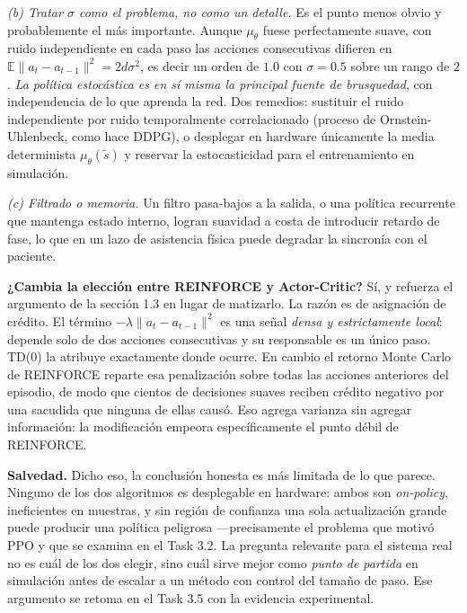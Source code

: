 \documentclass[11pt,letterpaper]{article}
\newcommand{\Esp}{\mathbb{E}}
\newcommand{\lead}[1]{\textbf{#1}}
\begin{document}
\begin{respuesta}
\emph{(b) Tratar $\sigma$ como el problema, no como un detalle.} Es el punto menos obvio y
probablemente el más importante. Aunque $\mu_\theta$ fuese perfectamente suave, con ruido
independiente en cada paso las acciones consecutivas difieren en
$\Esp\lVert a_t - a_{t-1}\rVert^2 = 2d\sigma^2$, es decir un orden de $1.0$ con
$\sigma=0.5$ sobre un rango de $2$. \emph{La política estocástica es en sí misma la
principal fuente de brusquedad}, con independencia de lo que aprenda la red. Dos remedios:
sustituir el ruido independiente por ruido temporalmente correlacionado (proceso de
Ornstein-Uhlenbeck, como hace DDPG), o desplegar en hardware únicamente la media
determinista $\mu_\theta(\tilde{s})$ y reservar la estocasticidad para el entrenamiento en
simulación.

\emph{(c) Filtrado o memoria.} Un filtro pasa-bajos a la salida, o una política recurrente
que mantenga estado interno, logran suavidad a costa de introducir retardo de fase, lo
que en un lazo de asistencia física puede degradar la sincronía con el paciente.

\medskip
\lead{¿Cambia la elección entre REINFORCE y Actor-Critic?} Sí, y refuerza el argumento de
la sección 1.3 en lugar de matizarlo. La razón es de asignación de crédito. El término
$-\lambda\lVert a_t - a_{t-1}\rVert^2$ es una señal \emph{densa y estrictamente local}:
depende solo de dos acciones consecutivas y su responsable es un único paso. TD(0) la
atribuye exactamente donde ocurre. En cambio el retorno Monte Carlo de REINFORCE reparte
esa penalización sobre todas las acciones anteriores del episodio, de modo que cientos de
decisiones suaves reciben crédito negativo por una sacudida que ninguna de ellas causó.
Eso agrega varianza sin agregar información: la modificación empeora específicamente el
punto débil de REINFORCE.

\medskip
\lead{Salvedad.} Dicho eso, la conclusión honesta es más limitada de lo que parece.
Ninguno de los dos algoritmos es desplegable en hardware: ambos son \textit{on-policy},
ineficientes en muestras, y sin región de confianza una sola actualización grande puede
producir una política peligrosa —precisamente el problema que motivó PPO y que se examina
en el Task 3.2. La pregunta relevante para el sistema real no es cuál de los dos elegir,
sino cuál sirve mejor como \emph{punto de partida} en simulación antes de escalar a un
método con control del tamaño de paso. Ese argumento se retoma en el Task 3.5 con la
evidencia experimental.
\end{respuesta}
\end{document}
